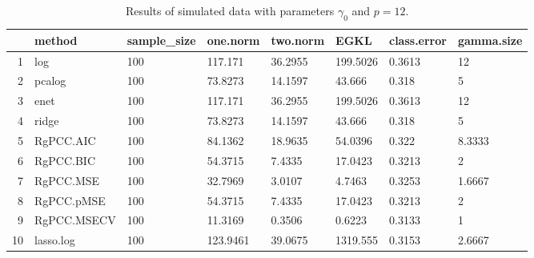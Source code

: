 \begin{table}[ht]
\centering
\begin{tabular}{rlllllll}
  \hline
 & method & sample\_size & one.norm & two.norm & EGKL & class.error & gamma.size \\ 
  \hline
1 & log & 100 & 117.171 & 36.2955 & 199.5026 & 0.3613 & 12 \\ 
  2 & pcalog & 100 & 73.8273 & 14.1597 & 43.666 & 0.318 & 5 \\ 
  3 & enet & 100 & 117.171 & 36.2955 & 199.5026 & 0.3613 & 12 \\ 
  4 & ridge & 100 & 73.8273 & 14.1597 & 43.666 & 0.318 & 5 \\ 
  5 & RgPCC.AIC & 100 & 84.1362 & 18.9635 & 54.0396 & 0.322 & 8.3333 \\ 
  6 & RgPCC.BIC & 100 & 54.3715 & 7.4335 & 17.0423 & 0.3213 & 2 \\ 
  7 & RgPCC.MSE & 100 & 32.7969 & 3.0107 & 4.7463 & 0.3253 & 1.6667 \\ 
  8 & RgPCC.pMSE & 100 & 54.3715 & 7.4335 & 17.0423 & 0.3213 & 2 \\ 
  9 & RgPCC.MSECV & 100 & 11.3169 & 0.3506 & 0.6223 & 0.3133 & 1 \\ 
  10 & lasso.log & 100 & 123.9461 & 39.0675 & 1319.555 & 0.3153 & 2.6667 \\ 
   \hline
\end{tabular}
\caption{Results of simulated data with parameters $\gamma_0$ and $p =12$. } 
\label{fig-0-debug-new-algo-12-metrics-p}
\end{table}
